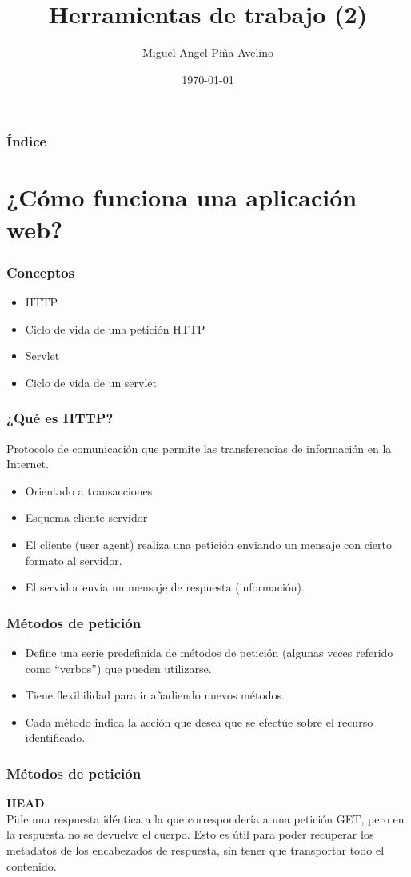 \documentclass{beamer}
\title[Laboratorio]{Herramientas de trabajo (2)}
\author[Miguel]{Miguel Angel Piña Avelino}
\institute[UNAM]{
  Ingeniería de Software,\\
  Facultad de Ciencias, UNAM
}
\date{\today}
\begin{document}
\frame{\titlepage}
\begin{frame}
  \frametitle{Índice}
  \tableofcontents
\end{frame}

\section{¿Cómo funciona una aplicación web?}

\begin{frame}
  \frametitle{Conceptos}
  \begin{itemize}[<+->]
  \item HTTP
  \item Ciclo de vida de una petición HTTP
  \item Servlet
  \item Ciclo de vida de un servlet
  \end{itemize}
\end{frame}

\begin{frame}
  \frametitle{¿Qué es HTTP?}
  Protocolo de comunicación que permite las transferencias de
  información en la Internet.
  \begin{itemize}[<+->]
  \item Orientado a transacciones
  \item Esquema cliente servidor
  \item El cliente (user agent) realiza una petición enviando un
    mensaje con cierto formato al servidor.
  \item El servidor envía un mensaje de respuesta (información).
  \end{itemize}
\end{frame}

\begin{frame}
  \frametitle{Métodos de petición}
  \begin{itemize}[<+->]
    \item Define una serie predefinida de métodos de petición (algunas
      veces referido como ``verbos'') que pueden utilizarse.
    \item Tiene flexibilidad para ir añadiendo nuevos métodos.
    \item Cada método indica la acción que desea que se efectúe sobre el recurso
      identificado.
  \end{itemize}
\end{frame}

\begin{frame}
  \frametitle{Métodos de petición}
  \textbf{HEAD}\\
  Pide una respuesta idéntica a la que correspondería a una petición
  GET, pero en la respuesta no se devuelve el cuerpo. Esto es útil
  para poder recuperar los metadatos de los encabezados de respuesta,
  sin tener que transportar todo el contenido.
\end{frame}
\end{document}
